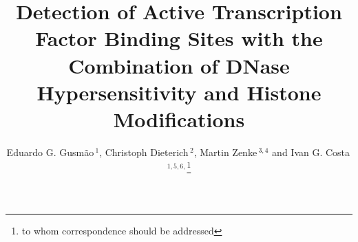 \documentclass{bioinfo}
\begin{document}

\title[Detection of Active TFBSs with the Combination of DNase Hypersensitivity and Histone Modifications]
{Detection of Active Transcription Factor Binding Sites with the Combination of DNase Hypersensitivity and Histone Modifications}
\author[Gusm\~{a}o \textit{et~al}]{Eduardo G. Gusm\~{a}o\,$^{1}$, Christoph Dieterich\,$^{2}$, Martin Zenke\,$^{3,4}$ and Ivan G. Costa\,$^{1,5,6,}$\footnote{to whom correspondence should be addressed}}
\address{$^{1}$IZKF Computational Biology Research Group, Institute for Biomedical Engineering, RWTH Aachen University Medical School, Germany.\\
$^{2}$Computational RNA Biology and Ageing, Max Planck Institute for Biology of Ageing, Germany. \\
$^{3}$Department of Cell Biology, Institute for Biomedical Engineering, RWTH
Aachen University Medical School, Germany. \\
$^{4}$Helmholtz Institute for Biomedical Engineering, RWTH Aachen University, Germany. \\
$^{5}$Aachen Institute for Advanced Study in Computational Engineering Science (AICES), RWTH Aachen University, Germany. \\
$^{6}$Center of Informatics, Federal University of Pernambuco, Brazil.
}



\maketitle
\end{document}
